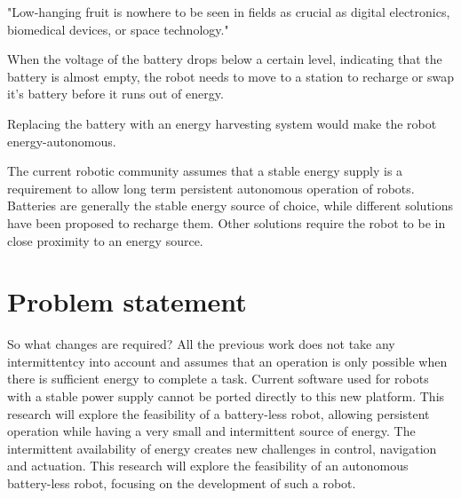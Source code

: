 "Low-hanging fruit is nowhere to be seen in fields as crucial as digital electronics, biomedical devices, or space technology."
\cite{zachary_spec_2016}





When the voltage of the battery drops below a certain level, indicating that the battery is almost empty, the robot needs to move to a station to recharge or swap it's battery before it runs out of energy.

Replacing the battery with an energy harvesting system would make the robot energy-autonomous. 


The current robotic community assumes that a stable energy supply is a requirement to allow long term persistent autonomous operation of robots.
Batteries are generally the stable energy source of choice, while different solutions have been proposed to recharge them.
Other solutions require the robot to be in close proximity to an energy source.








\section{Problem statement}


So what changes are required?
All the previous work does not take any intermittentcy into account and assumes that an operation is only possible when there is sufficient energy to complete a task.
Current software used for robots with a stable power supply cannot be ported directly to this new platform.
This research will explore the feasibility of a battery-less robot, allowing persistent operation while having a very small and intermittent source of energy.
The intermittent availability of energy creates new challenges in control, navigation and actuation. 
This research will explore the feasibility of an autonomous battery-less robot, focusing on the development of such a robot.

